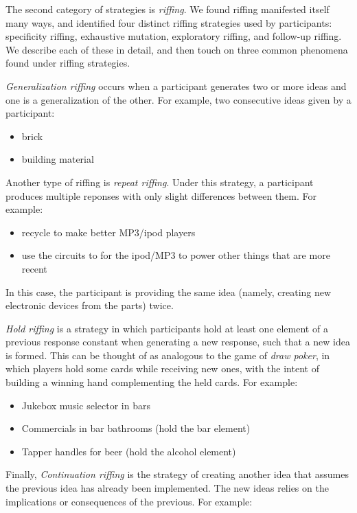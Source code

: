 The second category of strategies is \emph{riffing}.
We found riffing manifested itself many ways, and identified four distinct riffing strategies used by participants: specificity riffing, exhaustive mutation, exploratory riffing, and follow-up riffing. We describe each of these in detail, and then touch on three common phenomena found under riffing strategies.

\emph{Generalization riffing} occurs when a participant generates two or more ideas and one is a generalization of the other. For example, two consecutive ideas given by a participant:

\begin{itemize}
    \item brick
    \item building material
\end{itemize}

Another type of riffing is \emph{repeat riffing}. Under this strategy, a participant produces multiple reponses with only slight differences between them. For example:

\begin{itemize}
    \item recycle to make better MP3/ipod players
    \item use the circuits to for the ipod/MP3 to power other things that are more recent
\end{itemize}

In this case, the participant is providing the same idea (namely, creating new electronic devices from the parts) twice.

\emph{Hold riffing} is a strategy in which participants hold at least one element of a previous response constant when generating a new response, such that a new idea is formed. This can be thought of as analogous to the game of \emph{draw poker}, in which players hold some cards while receiving new ones, with the intent of building a winning hand complementing the held cards.
For example:

\begin{itemize}
    \item Jukebox music selector in bars
    \item Commercials in bar bathrooms (hold the bar element)
    \item Tapper handles for beer (hold the alcohol element)
\end{itemize}

Finally, \emph{Continuation riffing} is the strategy of creating another idea that assumes the previous idea has already been implemented. The new ideas relies on the implications or consequences of the previous. For example:

